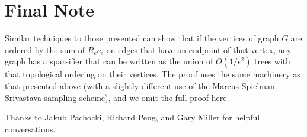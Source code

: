 \section{Final Note}
Similar techniques to those presented can show that if the vertices of graph $G$ are ordered by the sum of $R_ec_e$ on edges that have an endpoint of that vertex, any graph has a sparsifier that can be written as the union of $O(1/\epsilon^2)$ trees with that topological ordering on their vertices. The proof uses the same machinery as that presented above (with a slightly different use of the Marcus-Spielman-Srivastava sampling scheme), and we omit the full proof here.

Thanks to Jakub Pachocki, Richard Peng, and Gary Miller for helpful
conversations.
